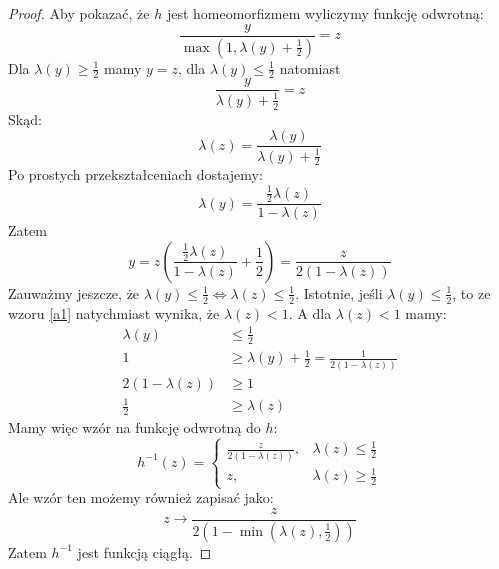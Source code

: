 \begin{lem}
\begin{proof}
    Aby pokazać, że $h$ jest homeomorfizmem wyliczymy funkcję odwrotną:
    \[
      \frac{y}{\max\left(1, \lambda(y) + \frac{1}{2}\right)} = z
    \]
    Dla $\lambda(y) \geq \frac{1}{2}$ mamy $y = z$, dla $\lambda(y) \leq \frac{1}{2}$ natomiast 
    \[
      \frac{y}{\lambda(y) + \frac{1}{2}} = z
    \]
    Skąd:
    \begin{equation}
      \label{a1}
      \lambda(z) = \frac{\lambda(y)}{\lambda(y) + \frac{1}{2}}
    \end{equation}
    Po prostych przekształceniach dostajemy:
    \[
      \lambda(y) = \frac{\frac{1}{2} \lambda(z)}{1 - \lambda(z)}
    \]
    Zatem
    \[
      y = z\left(\frac{\frac{1}{2} \lambda(z)}{1 - \lambda(z)} + \frac{1}{2}\right) = \frac{z}{2(1-\lambda(z))}
    \]
    Zauważmy jeszcze, że $\lambda(y) \leq \frac{1}{2} \iff \lambda(z) \leq \frac{1}{2}$. Istotnie, jeśli $\lambda(y) \leq \frac{1}{2}$, to ze wzoru \eqref{a1} natychmiast wynika, że $\lambda(z) < 1$. A dla $\lambda(z) < 1$ mamy:
    \begin{align*}
      \lambda(y) &\leq \frac{1}{2} \\
      1 &\geq \lambda(y) + \frac{1}{2} = \frac{1}{2(1-\lambda(z))} \\
      2(1-\lambda(z)) &\geq 1 \\
      \frac{1}{2} &\geq \lambda(z)
    \end{align*}
    Mamy więc wzór na funkcję odwrotną do $h$:
    \[
      h^{-1}(z) = 
      \begin{cases}
        \frac{z}{2(1-\lambda(z))},&\lambda(z) \leq \frac{1}{2} \\
        z,&\lambda(z) \geq \frac{1}{2}
      \end{cases}
    \]
    Ale wzór ten możemy również zapisać jako:
    \[
      z \to \frac{z}{2(1-\min(\lambda(z), \frac{1}{2}))}
    \]
    Zatem $h^{-1}$ jest funkcją ciągłą.
  \end{proof}
\end{lem}

